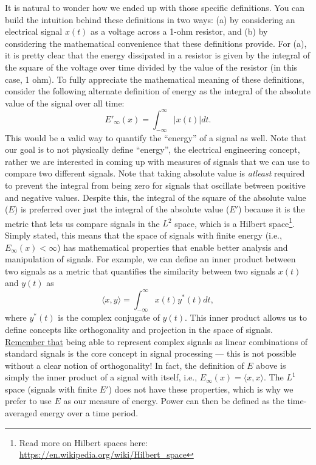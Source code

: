 \documentclass{ee102_notes}
\begin{document}
It is natural to wonder how we ended up with those specific definitions. You can build the intuition behind these definitions in two ways: (a) by considering an electrical signal $x(t)$ as a voltage across a 1-ohm resistor, and (b) by considering the mathematical convenience that these definitions provide. For (a), it is pretty clear that the energy dissipated in a resistor is given by the integral of the square of the voltage over time divided by the value of the resistor (in this case, 1 ohm). To fully appreciate the mathematical meaning of these definitions, consider the following alternate definition of energy as the integral of the absolute value of the signal over all time:
\[
E'_\infty(x) = \int_{-\infty}^{\infty} |x(t)| dt.
\]
This would be a valid way to quantify the ``energy'' of a signal as well. Note that our goal is to not physically define ``energy'', the electrical engineering concept, rather we are interested in coming up with measures of signals that we can use to compare two different signals. Note that taking absolute value is \textit{atleast} required to prevent the integral from being zero for signals that oscillate between positive and negative values. Despite this, the integral of the square of the absolute value ($E$) is preferred over just the integral of the absolute value ($E'$) because it is the metric that lets us compare signals in the $L^2$ space, which is a Hilbert space\footnote{Read more on Hilbert spaces here: \url{https://en.wikipedia.org/wiki/Hilbert_space}}. Simply stated, this means that the space of signals with finite energy (i.e., $E_\infty(x) < \infty$) has mathematical properties that enable better analysis and manipulation of signals. For example, we can define an inner product between two signals as a metric that quantifies the similarity between two signals $x(t)$ and $y(t)$ as \[
\langle x, y \rangle = \int_{-\infty}^{\infty} x(t) y^*(t) dt,
\]
where $y^*(t)$ is the complex conjugate of $y(t)$. This inner product allows us to define concepts like orthogonality and projection in the space of signals. \ul{Remember that} being able to represent complex signals as linear combinations of standard signals is the core concept in signal processing --- this is not possible without a clear notion of orthogonality! In fact, the definition of $E$ above is simply the inner product of a signal with itself, i.e., $E_\infty(x) = \langle x, x \rangle$. The $L^1$ space (signals with finite $E'$) does not have these properties, which is why we prefer to use $E$ as our measure of energy. Power can then be defined as the time-averaged energy over a time period.
\end{document}
